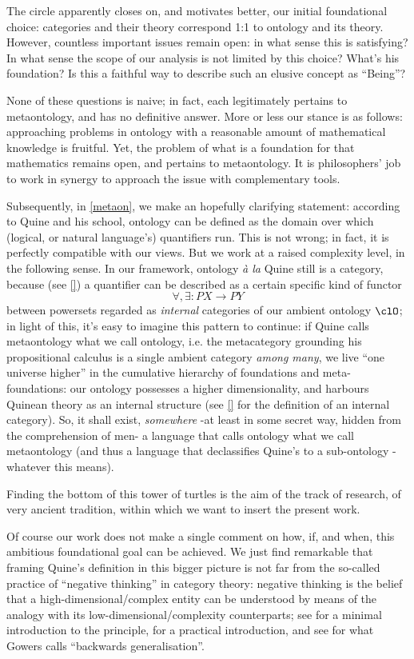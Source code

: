 The circle apparently closes on, and motivates better, our initial foundational choice: categories and their theory correspond 1:1 to ontology and its theory. However, countless important issues remain open: in what sense this is satisfying? In what sense the scope of our analysis is not limited by this choice? What's his foundation? Is this a faithful way to describe such an elusive concept as ``Being''?


None of these questions is naive; in fact, each legitimately pertains to metaontology, and has no definitive answer. More or less our stance is as follows: approaching problems in ontology with a reasonable amount of mathematical knowledge is fruitful. Yet, the problem of what is a foundation for that mathematics remains open, and pertains to metaontology. It is philosophers' job to work in synergy to approach the issue with complementary tools. 

Subsequently, in \autoref{metaon}, we make an hopefully clarifying statement: according to Quine and his school, ontology can be defined as the domain over which (logical, or natural language's) quantifiers run. This is not wrong; in fact, it is perfectly compatible with our views. But we work at a raised complexity level, in the following sense. In our framework, ontology \emph{à la} Quine still is a category, because (see \autoref{}) a quantifier can be described as a certain specific kind of functor
\[\forall,\exists : PX \to PY\]
between powersets regarded as \emph{internal} categories of our ambient ontology $\clO$; in light of this, it's easy to imagine this pattern to continue: if Quine calls metaontology what we call ontology, i.e. the metacategory grounding his propositional calculus is a single ambient category \emph{among many}, we live ``one universe higher'' in the cumulative hierarchy of foundations and meta-foundations: our ontology possesses a higher dimensionality, and harbours Quinean theory as an internal structure (see \autoref{} for the definition of an internal category). So, it shall exist, \emph{somewhere} -at least in some secret way, hidden from the comprehension of men- a language that calls ontology what we call metaontology (and thus a language that declassifies Quine's to a sub-ontology -whatever this means).

Finding the bottom of this tower of turtles is the aim of the track of research, of very ancient tradition, within which we want to insert the present work.

Of course our work does not make a single comment on how, if, and when, this ambitious foundational goal can be achieved. We just find remarkable that framing Quine's definition in this bigger picture is not far from the so-called practice of ``negative thinking'' in category theory: negative thinking is the belief that a high-dimensional/complex entity can be understood by means of the analogy with its low-dimensional/complexity counterparts; see \cite{nlab:category-order,nlab:neg-think} for a minimal introduction to the principle, \cite{baez2010lectures} for a practical introduction, and see \cite{gowers2007} for what Gowers calls ``backwards generalisation''.

